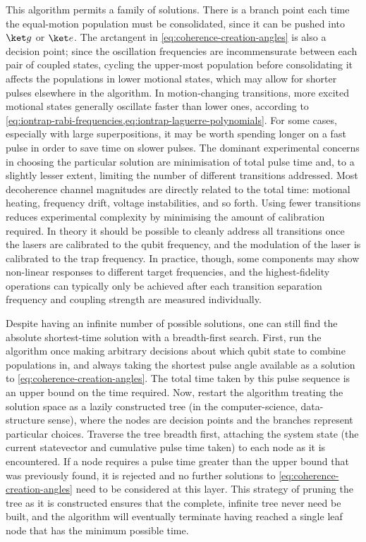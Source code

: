 This algorithm permits a family of solutions.
There is a branch point each time the equal-motion population must be consolidated, since it can be pushed into $\ket g$ or $\ket e$.
The arctangent in \cref{eq:coherence-creation-angles} is also a decision point; since the oscillation frequencies are incommensurate between each pair of coupled states, cycling the upper-most population before consolidating it affects the populations in lower motional states, which may allow for shorter pulses elsewhere in the algorithm.
In motion-changing transitions, more excited motional states generally oscillate faster than lower ones, according to \cref{eq:iontrap-rabi-frequencies,eq:iontrap-laguerre-polynomials}.
For some cases, especially with large superpositions, it may be worth spending longer on a fast pulse in order to save time on slower pulses.
The dominant experimental concerns in choosing the particular solution are minimisation of total pulse time and, to a slightly lesser extent, limiting the number of different transitions addressed.
Most decoherence channel magnitudes are directly related to the total time: motional heating, frequency drift, voltage instabilities, and so forth.
Using fewer transitions reduces experimental complexity by minimising the amount of calibration required.
In theory it should be possible to cleanly address all transitions once the lasers are calibrated to the qubit frequency, and the modulation of the laser is calibrated to the trap frequency.
In practice, though, some components may show non-linear responses to different target frequencies, and the highest-fidelity operations can typically only be achieved after each transition separation frequency and coupling strength are measured individually.

Despite having an infinite number of possible solutions, one can still find the absolute shortest-time solution with a breadth-first search.
First, run the algorithm once making arbitrary decisions about which qubit state to combine populations in, and always taking the shortest pulse angle available as a solution to \cref{eq:coherence-creation-angles}.
The total time taken by this pulse sequence is an upper bound on the time required.
Now, restart the algorithm treating the solution space as a lazily constructed tree (in the computer-science, data-structure sense), where the nodes are decision points and the branches represent particular choices.
Traverse the tree breadth first, attaching the system state (the current statevector and cumulative pulse time taken) to each node as it is encountered.
If a node requires a pulse time greater than the upper bound that was previously found, it is rejected and no further solutions to \cref{eq:coherence-creation-angles} need to be considered at this layer.
This strategy of pruning the tree as it is constructed ensures that the complete, infinite tree never need be built, and the algorithm will eventually terminate having reached a single leaf node that has the minimum possible time.

